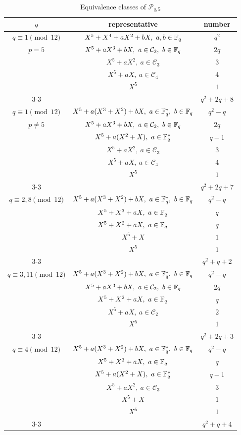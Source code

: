 \documentclass{amsart}
\numberwithin{equation}{section}
\theoremstyle{definition}
\newcommand{\f}{\Bbb F}
\begin{document}
\begin{table}[h]
\caption{Equivalence classes of $\mathcal P_{q,5}$}\label{Tb-q5}
   \renewcommand*{\arraystretch}{1.2}
    \centering
     \begin{tabular}{c|c|c}
     \hline
     	$q$ & representative & number \\ \hline 
	    $q\equiv 1\pmod{12}$ & $X^5+X^4+aX^2+bX,\ a,b\in\f_q$ & $q^2$ \\
	    $p=5$ & $X^5+aX^3+bX,\ a\in\mathcal C_2,\ b\in\f_q$ & $2q$ \\
	    & $X^5+aX^2,\ a\in\mathcal C_3$ & $3$ \\
	    & $X^5+aX,\ a\in\mathcal C_4$ & $4$ \\
	    & $X^5$ & $1$ \\ \cline{3-3}
	    & & $q^2+2q+8$ \\  \hline
	    $q\equiv 1\pmod{12}$ & $X^5+a(X^3+X^2)+bX,\ a\in\f_q^*,\ b\in\f_q$ & $q^2-q$ \\
	    $p\ne 5$ & $X^5+aX^3+bX,\ a\in\mathcal C_2,\ b\in\f_q$ & $2q$ \\
	    & $X^5+a(X^2+X),\ a\in\f_q^*$ & $q-1$ \\
	    & $X^5+aX^2,\ a\in\mathcal C_3$ & $3$ \\
	    & $X^5+aX,\ a\in\mathcal C_4$ & $4$ \\
	    & $X^5$ & $1$ \\ \cline{3-3}
	    & & $q^2+2q+7$ \\  \hline 
	    $q\equiv 2,8\pmod{12}$ & $X^5+a(X^3+X^2)+bX,\ a\in\f_q^*,\ b\in\f_q$ & $q^2-q$ \\
	    & $X^5+X^3+aX,\ a\in\f_q$ & $q$ \\
	    & $X^5+X^2+aX,\ a\in\f_q$ & $q$ \\
	    & $X^5+X$ & $1$ \\
	    & $X^5$ & $1$ \\ \cline{3-3}
	    & & $q^2+q+2$ \\  \hline
	    $q\equiv 3,11\pmod{12}$ & $X^5+a(X^3+X^2)+bX,\ a\in\f_q^*,\ b\in\f_q$ & $q^2-q$ \\
	    & $X^5+aX^3+bX,\ a\in\mathcal C_2,\ b\in\f_q$ & $2q$ \\
	    & $X^5+X^2+aX,\ a\in\f_q$ & $q$ \\
	    & $X^5+aX,\ a\in\mathcal C_2$ & $2$ \\
	    & $X^5$ & $1$ \\ \cline{3-3}
	    & & $q^2+2q+3$ \\  \hline
	    $q\equiv 4\pmod{12}$ & $X^5+a(X^3+X^2)+bX,\ a\in\f_q^*,\ b\in\f_q$ & $q^2-q$ \\
	    & $X^5+X^3+aX,\ a\in\f_q$ & $q$ \\
	    & $X^5+a(X^2+X),\ a\in\f_q^*$ & $q-1$ \\
	    & $X^5+aX^2,\ a\in\mathcal C_3$ & $3$ \\
	    & $X^5+X$ & $1$ \\
	    & $X^5$ & $1$ \\ \cline{3-3}
	    & & $q^2+q+4$ \\  \hline
	\end{tabular}
\end{table} 
\end{document}
